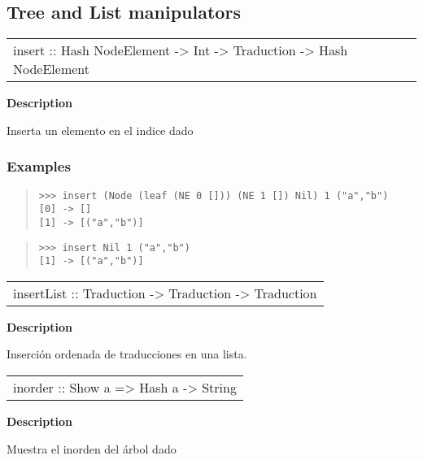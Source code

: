 \subsection{Tree and List manipulators}
\begin{haddockdesc}
\item[\begin{tabular}{@{}l}
insert :: Hash NodeElement -> Int -> Traduction -> Hash NodeElement
\end{tabular}]
{\haddockbegindoc
\textbf{Description}\par
Inserta un elemento en el indice dado\par
\subsubsection*{\textbf{Examples}}
\begin{quote}
{\haddockverb\begin{verbatim}
>>> insert (Node (leaf (NE 0 [])) (NE 1 []) Nil) 1 ("a","b")
[0] -> []
[1] -> [("a","b")]

\end{verbatim}}
\end{quote}
\begin{quote}
{\haddockverb\begin{verbatim}
>>> insert Nil 1 ("a","b")
[1] -> [("a","b")]

\end{verbatim}}
\end{quote}}
\end{haddockdesc}
\begin{haddockdesc}
\item[\begin{tabular}{@{}l}
insertList :: {\char 91}Traduction{\char 93} -> Traduction -> {\char 91}Traduction{\char 93}
\end{tabular}]
{\haddockbegindoc
\textbf{Description}\par
Inserción ordenada de traducciones en una lista.\par}
\end{haddockdesc}
\begin{haddockdesc}
\item[\begin{tabular}{@{}l}
inorder :: Show a => Hash a -> String
\end{tabular}]
{\haddockbegindoc
\textbf{Description}\par
Muestra el inorden del árbol dado\par}
\end{haddockdesc}
